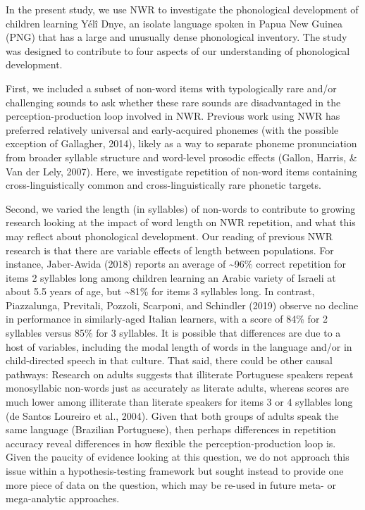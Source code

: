 \documentclass[english,,man,floatsintext]{apa6}
\begin{document}
In the present study, we use NWR to investigate the phonological development of children learning Yélî Dnye, an isolate language spoken in Papua New Guinea (PNG) that has a large and unusually dense phonological inventory. The study was designed to contribute to four aspects of our understanding of phonological development.

First, we included a subset of non-word items with typologically rare and/or challenging sounds to ask whether these rare sounds are disadvantaged in the perception-production loop involved in NWR. Previous work using NWR has preferred relatively universal and early-acquired phonemes (with the possible exception of Gallagher, 2014), likely as a way to separate phoneme pronunciation from broader syllable structure and word-level prosodic effects (Gallon, Harris, \& Van der Lely, 2007). Here, we investigate repetition of non-word items containing cross-linguistically common and cross-linguistically rare phonetic targets.

Second, we varied the length (in syllables) of non-words to contribute to growing research looking at the impact of word length on NWR repetition, and what this may reflect about phonological development. Our reading of previous NWR research is that there are variable effects of length between populations. For instance, Jaber-Awida (2018) reports an average of \textasciitilde{}96\% correct repetition for items 2 syllables long among children learning an Arabic variety of Israeli at about 5.5 years of age, but \textasciitilde{}81\% for items 3 syllables long. In contrast, Piazzalunga, Previtali, Pozzoli, Scarponi, and Schindler (2019) observe no decline in performance in similarly-aged Italian learners, with a score of 84\% for 2 syllables versus 85\% for 3 syllables. It is possible that differences are due to a host of variables, including the modal length of words in the language and/or in child-directed speech in that culture. That said, there could be other causal pathways: Research on adults suggests that illiterate Portuguese speakers repeat monosyllabic non-words just as accurately as literate adults, whereas scores are much lower among illiterate than literate speakers for items 3 or 4 syllables long (de Santos Loureiro et al., 2004). Given that both groups of adults speak the same language (Brazilian Portuguese), then perhaps differences in repetition accuracy reveal differences in how flexible the perception-production loop is. Given the paucity of evidence looking at this question, we do not approach this issue within a hypothesis-testing framework but sought instead to provide one more piece of data on the question, which may be re-used in future meta- or mega-analytic approaches.
\end{document}
